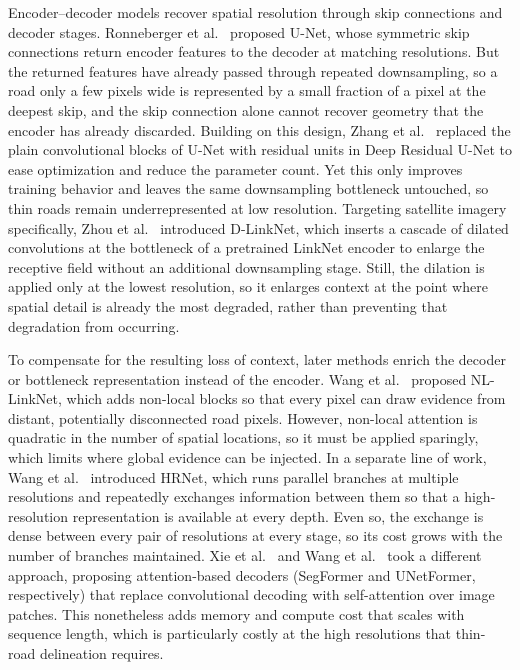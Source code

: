\documentclass[a4paper,fleqn, review]{cas-sc}
\begin{document}
Encoder--decoder models recover spatial resolution through skip connections
and decoder stages. Ronneberger et al.~\cite{ronneberger2015unet} proposed
U-Net, whose symmetric skip connections return encoder features to the
decoder at matching resolutions. But the returned features have already
passed through repeated downsampling, so a road only a few pixels wide is
represented by a small fraction of a pixel at the deepest skip, and the skip
connection alone cannot recover geometry that the encoder has already
discarded. Building on this design, Zhang et al.~\cite{zhang2018resunet}
replaced the plain convolutional blocks of U-Net with residual units in
Deep Residual U-Net to ease optimization and reduce the parameter count.
Yet this only improves training behavior and leaves the same downsampling
bottleneck untouched, so thin roads remain underrepresented at low
resolution. Targeting satellite imagery specifically, Zhou et
al.~\cite{zhou2018dlinknet} introduced D-LinkNet, which inserts a cascade of
dilated convolutions at the bottleneck of a pretrained LinkNet encoder to
enlarge the receptive field without an additional downsampling stage. Still,
the dilation is applied only at the lowest resolution, so it enlarges
context at the point where spatial detail is already the most degraded,
rather than preventing that degradation from occurring.

To compensate for the resulting loss of context, later methods enrich the
decoder or bottleneck representation instead of the encoder. Wang et
al.~\cite{wang2022nllinknet} proposed NL-LinkNet, which adds non-local
blocks so that every pixel can draw evidence from distant, potentially
disconnected road pixels. However, non-local attention is quadratic in the
number of spatial locations, so it must be applied sparingly, which limits
where global evidence can be injected. In a separate line of work, Wang et
al.~\cite{wang2021hrnet} introduced HRNet, which runs parallel branches at
multiple resolutions and repeatedly exchanges information between them so
that a high-resolution representation is available at every depth. Even so,
the exchange is dense between every pair of resolutions at every stage, so
its cost grows with the number of branches maintained. Xie et
al.~\cite{xie2021segformer} and Wang et al.~\cite{wang2022unetformer} took a
different approach, proposing attention-based decoders (SegFormer and
UNetFormer, respectively) that replace convolutional decoding with
self-attention over image patches. This nonetheless adds memory and compute
cost that scales with sequence length, which is particularly costly at the
high resolutions that thin-road delineation requires.
\end{document}
